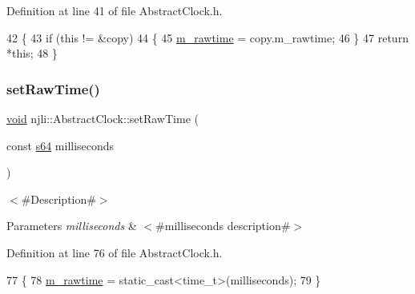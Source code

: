 Definition at line 41 of file Abstract\+Clock.\+h.


\begin{DoxyCode}
42     \{
43       \textcolor{keywordflow}{if} (\textcolor{keyword}{this} != &copy)
44         \{
45           \mbox{\hyperlink{classnjli_1_1_abstract_clock_a668e9ea61bf8c76643255af6b65f2a59}{m\_rawtime}} = copy.m\_rawtime;
46         \}
47       \textcolor{keywordflow}{return} *\textcolor{keyword}{this};
48     \}
\end{DoxyCode}
\mbox{\label{classnjli_1_1_abstract_clock_ad837eada8b3deafe40d6a2e27efa048a}} 
\subsubsection{\texorpdfstring{set\+Raw\+Time()}{setRawTime()}}
{\footnotesize\ttfamily \mbox{\hyperlink{_thread_8h_af1e856da2e658414cb2456cb6f7ebc66}{void}} njli\+::\+Abstract\+Clock\+::set\+Raw\+Time (\begin{DoxyParamCaption}\item[{const \mbox{\hyperlink{_util_8h_a4258bfb2c3a440d06c4aaa3c2b450dde}{s64}}}]{milliseconds }\end{DoxyParamCaption})\hspace{0.3cm}{\ttfamily [inline]}}

$<$\#\+Description\#$>$


\begin{DoxyParams}{Parameters}
{\em milliseconds} & $<$\#milliseconds description\#$>$ \\
\hline
\end{DoxyParams}


Definition at line 76 of file Abstract\+Clock.\+h.


\begin{DoxyCode}
77     \{
78       \mbox{\hyperlink{classnjli_1_1_abstract_clock_a668e9ea61bf8c76643255af6b65f2a59}{m\_rawtime}} = \textcolor{keyword}{static\_cast<}time\_t\textcolor{keyword}{>}(milliseconds);
79     \}
\end{DoxyCode}
\mbox{\label{classnjli_1_1_abstract_clock_a06401048780f7b9522187731d3a97579}} 
